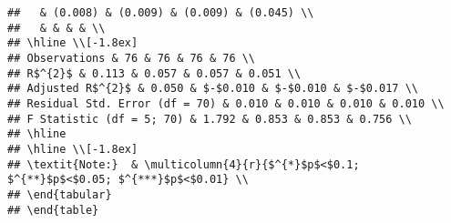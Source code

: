 \documentclass[
]{article}
\begin{document}
\begin{verbatim}
##   & (0.008) & (0.009) & (0.009) & (0.045) \\ 
##   & & & & \\ 
## \hline \\[-1.8ex] 
## Observations & 76 & 76 & 76 & 76 \\ 
## R$^{2}$ & 0.113 & 0.057 & 0.057 & 0.051 \\ 
## Adjusted R$^{2}$ & 0.050 & $-$0.010 & $-$0.010 & $-$0.017 \\ 
## Residual Std. Error (df = 70) & 0.010 & 0.010 & 0.010 & 0.010 \\ 
## F Statistic (df = 5; 70) & 1.792 & 0.853 & 0.853 & 0.756 \\ 
## \hline 
## \hline \\[-1.8ex] 
## \textit{Note:}  & \multicolumn{4}{r}{$^{*}$p$<$0.1; $^{**}$p$<$0.05; $^{***}$p$<$0.01} \\ 
## \end{tabular} 
## \end{table}
\end{verbatim}
\end{document}
